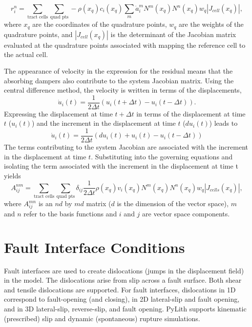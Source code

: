 \begin{equation}
r_{i}^{n}=\sum_{\text{tract cells}}\sum_{\text{quad pts}}-\rho(x_{q})c_{i}(x_{q})\sum_{m}\dot{a}_{i}^{m}N^{m}(x_{q})N^{n}(x_{q})w_{q}|J_{cell}(x_{q})|,
\end{equation}
 where $x_{q}$ are the coordinates of the quadrature points, $w_{q}$
are the weights of the quadrature points, and $|J_{cell}(x_{q})|$
is the determinant of the Jacobian matrix evaluated at the quadrature
points associated with mapping the reference cell to the actual cell.

The appearance of velocity in the expression for the residual means
that the absorbing dampers also contribute to the system Jacobian
matrix. Using the central difference method, the velocity is written
in terms of the displacements,
\begin{equation}
\dot{u}_{i}(t)=\frac{1}{2\Delta t}(u_{i}(t+\Delta t)-u_{i}(t-\Delta t)).
\end{equation}
Expressing the displacement at time $t+\Delta t$ in terms of the
displacement at time $t$ ($u_{i}(t)$) and the increment in the displacement
at time $t$ ($du_{i}(t)$) leads to
\begin{equation}
\dot{u}_{i}(t)=\frac{1}{2\Delta t}(du_{i}(t)+u_{i}(t)-u_{i}(t-\Delta t))
\end{equation}
The terms contributing to the system Jacobian are associated with
the increment in the displacement at time $t$. Substituting into
the governing equations and isolating the term associated with the
increment in the displacement at time t yields
\begin{equation}
A_{ij}^{nm}=\sum_{\text{tract cells}}\sum_{\text{quad pts}}\delta_{ij}\frac{1}{2\Delta t}\rho(x_{q})v_{i}(x_{q})N^{m}(x_{q})N^{n}(x_{q})w_{q}|J_{cells}(x_{q})|,
\end{equation}
where $A_{ij}^{mn}$ is an $nd$ by $md$ matrix ($d$ is the dimension
of the vector space), $m$ and $n$ refer to the basis functions and
$i$ and $j$ are vector space components.


\section{Fault Interface Conditions}
\label{sec:fault}

Fault interfaces are used to create dislocations (jumps in the displacement
field) in the model. The dislocations arise from slip across a fault
surface. Both shear and tensile dislocations are supported. For fault
interfaces, dislocations in 1D correspond to fault-opening (and closing),
in 2D lateral-slip and fault opening, and in 3D lateral-slip, reverse-slip,
and fault opening. PyLith supports kinematic (prescribed) slip and
dynamic (spontaneous) rupture simulations.

